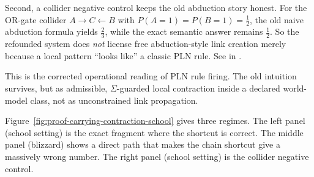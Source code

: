 \documentclass[11pt,openany]{report}
\begin{document}
Second, a collider negative control keeps the old abduction story honest.
For the OR-gate collider $A \to C \leftarrow B$ with
$P(A{=}1)=P(B{=}1)=\tfrac12$, the old naive abduction formula yields
$\tfrac23$, while the exact semantic answer remains $\tfrac12$.  So the
refounded system does \emph{not} license free abduction-style link
creation merely because a local pattern ``looks like'' a classic PLN
rule.  See  in
.

This is the corrected operational reading of PLN rule firing.  The old
intuition survives, but as admissible, $\Sigma$-guarded local contraction
inside a declared world-model class, not as unconstrained link
propagation.

Figure~\ref{fig:proof-carrying-contraction-school} gives three regimes.
The left panel (school setting) is the exact fragment where the shortcut
is correct.  The middle panel (blizzard) shows a direct path that makes
the chain shortcut give a massively wrong number.  The right panel
(school setting) is the collider negative control.
\end{document}
